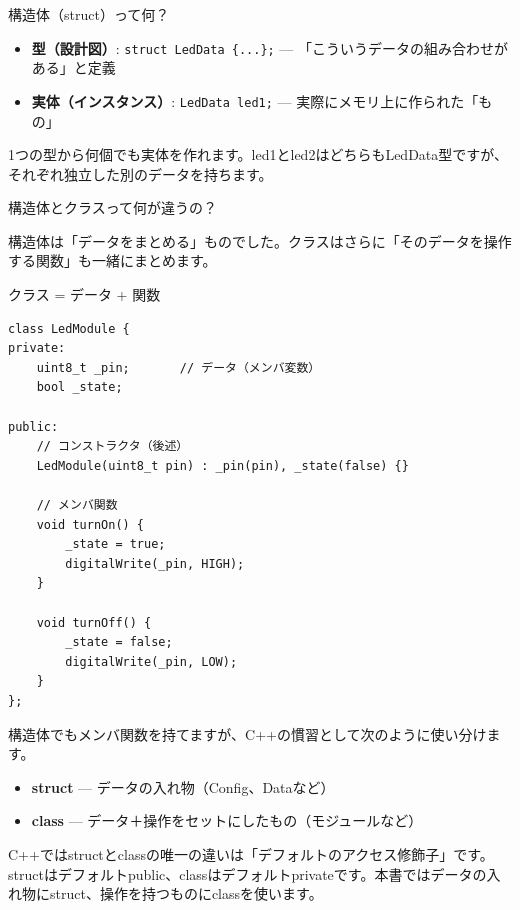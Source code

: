 \begin{qabox}{構造体（struct）って何？}
\begin{cautionbox}
\begin{itemize}
    \item \textbf{型（設計図）}: \texttt{struct LedData \{...\};} — 「こういうデータの組み合わせがある」と定義
    \item \textbf{実体（インスタンス）}: \texttt{LedData led1;} — 実際にメモリ上に作られた「もの」
\end{itemize}

1つの型から何個でも実体を作れます。led1とled2はどちらもLedData型ですが、それぞれ独立した別のデータを持ちます。
\end{cautionbox}

\end{qabox}

\begin{qabox}{構造体とクラスって何が違うの？}

構造体は「データをまとめる」ものでした。クラスはさらに「そのデータを操作する関数」も一緒にまとめます。

\begin{goodexample}{クラス = データ + 関数}
\begin{lstlisting}
class LedModule {
private:
    uint8_t _pin;       // データ（メンバ変数）
    bool _state;

public:
    // コンストラクタ（後述）
    LedModule(uint8_t pin) : _pin(pin), _state(false) {}

    // メンバ関数
    void turnOn() {
        _state = true;
        digitalWrite(_pin, HIGH);
    }

    void turnOff() {
        _state = false;
        digitalWrite(_pin, LOW);
    }
};
\end{lstlisting}
\end{goodexample}

構造体でもメンバ関数を持てますが、C++の慣習として次のように使い分けます。

\begin{itemize}
  \item \textbf{struct} — データの入れ物（Config、Dataなど）
  \item \textbf{class} — データ＋操作をセットにしたもの（モジュールなど）
\end{itemize}

\begin{notebox}[structとclassの技術的な違い]
C++ではstructとclassの唯一の違いは「デフォルトのアクセス修飾子」です。structはデフォルトpublic、classはデフォルトprivateです。本書ではデータの入れ物にstruct、操作を持つものにclassを使います。
\end{notebox}


\end{qabox}
